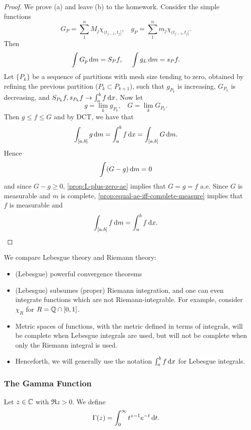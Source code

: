 \documentclass[12pt]{article} %
\begin{document}
\begin{proof}
    We prove (a) and leave (b) to the homework. Consider the simple functions \[G_P = \sum_1^n M_j \chi_{(t_{j-1}, t_j]}, \ \ \ \ g_P = \sum_1^n m_j \chi_{(t_{j-1}, t_j]}.\] Then \[\int G_p \, \mathrm{d} m = S_P f, \ \ \ \ \int g_L \, \mathrm{d} m = s_P f.\] Let $\{P_k\}$ be a sequence of partitions with mesh size tending to zero, obtained by refining the previous partition ($P_k \subset P_{k+1}$), such that $g_{P_k}$ is increasing, $G_{P_k}$ is decreasing, and $S_{P_k} f, s_{P_k} f \to \int_a^b f \, \mathrm{d} x$. Now let \[g = \lim_k g_{P_k}, \ \ \ \ G = \lim_k G_{P_k}.\] Then $g \leq f \leq G$ and by DCT, we have that \[\int_{[a, b]} g \, \mathrm{d} m = \int_a^b f \, \mathrm{d} x = \int_{[a, b]} G \, \mathrm{d} m.\] Hence \[\int(G - g) \, \mathrm{d} m = 0\] and since $G - g \geq 0$, \cref{prop:L-plus-zero-ae} implies that $G = g = f$ a.e. Since $G$ is measurable and $m$ is complete, \cref{prop:equal-ae-iff-complete-measure} implies that $f$ is measurable and \[\int_{[a, b]} f \, \mathrm{d} m = \int_a^b f \, \mathrm{d} x.\]
\end{proof}

\begin{remark}
    We compare Lebesgue theory and Riemann theory:
    \begin{itemize}
        \item (Lebesgue) powerful convergence theorems
        \item (Lebesgue) subsumes (proper) Riemann integration, and one can even integrate functions which are not Riemann-integrable. For example, consider $\chi_{R}$ for $R = \mathbb{Q} \cap [0,1]$.
        \item Metric spaces of functions, with the metric defined in terms of integrals, will be complete when Lebesgue integrals are used, but will not be complete when only the Riemann integral is used.
        \item Henceforth, we will generally use the notation $\int_a^b f \, \mathrm{d} x$ for Lebesgue integrals.
    \end{itemize}
\end{remark}

\subsubsection{The Gamma Function}

\begin{definition}
    Let $z \in \mathbb{C}$ with $\Re z > 0$. We define \[\Gamma(z) = \int_0^\infty t^{z-1}e^{-t}\, \mathrm{d} t.\]
\end{definition}
\end{document}
